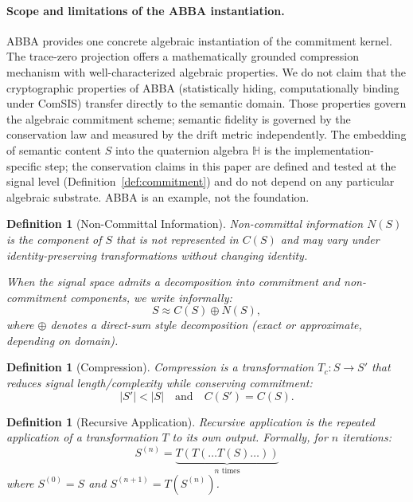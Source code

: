 \documentclass[11pt,a4paper]{article}
\newtheorem{definition}[theorem]{Definition}
\begin{document}
\paragraph{Scope and limitations of the ABBA instantiation.}
ABBA provides one concrete algebraic instantiation of the commitment kernel. The trace-zero projection offers a mathematically grounded compression mechanism with well-characterized algebraic properties. We do not claim that the cryptographic properties of ABBA (statistically hiding, computationally binding under ComSIS) transfer directly to the semantic domain. Those properties govern the algebraic commitment scheme; semantic fidelity is governed by the conservation law and measured by the drift metric independently. The embedding of semantic content $S$ into the quaternion algebra $\mathbb{H}$ is the implementation-specific step; the conservation claims in this paper are defined and tested at the signal level (Definition~\ref{def:commitment}) and do not depend on any particular algebraic substrate. ABBA is an example, not the foundation.

\begin{definition}[Non-Committal Information]
Non-committal information $N(S)$ is the component of $S$ that is not represented in $C(S)$ and may vary under identity-preserving transformations without changing identity.

When the signal space admits a decomposition into commitment and non-commitment components, we write informally:
\begin{equation}
S \approx C(S) \oplus N(S),
\end{equation}
where $\oplus$ denotes a direct-sum style decomposition (exact or approximate, depending on domain).
\end{definition}

\begin{definition}[Compression]
Compression is a transformation $T_c: S \rightarrow S'$ that reduces signal length/complexity while conserving commitment:
\begin{equation}
|S'| < |S| \quad \text{and} \quad C(S') = C(S).
\end{equation}
\end{definition}

\begin{definition}[Recursive Application]
Recursive application is the repeated application of a transformation $T$ to its own output. Formally, for $n$ iterations:
\begin{equation}
S^{(n)} = \underbrace{T(T(\ldots T(S)\ldots))}_{n \text{ times}}
\end{equation}
where $S^{(0)} = S$ and $S^{(n+1)} = T(S^{(n)})$.
\end{definition}
\end{document}
